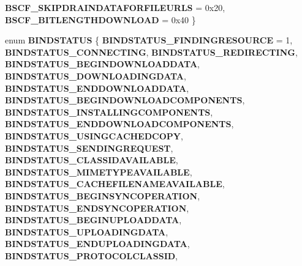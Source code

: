 \begin{DoxyCompactItemize}
{\bfseries B\+S\+C\+F\+\_\+\+S\+K\+I\+P\+D\+R\+A\+I\+N\+D\+A\+T\+A\+F\+O\+R\+F\+I\+L\+E\+U\+R\+LS} = 0x20, 
{\bfseries B\+S\+C\+F\+\_\+B\+I\+T\+L\+E\+N\+G\+T\+H\+D\+O\+W\+N\+L\+O\+AD} = 0x40
 \}
\item 
\mbox{\label{interface_i_bind_status_callback_af3b79c7ef1f1b339b02de3c5c35e7f06}} 
enum {\bfseries B\+I\+N\+D\+S\+T\+A\+T\+US} \{ \newline
{\bfseries B\+I\+N\+D\+S\+T\+A\+T\+U\+S\+\_\+\+F\+I\+N\+D\+I\+N\+G\+R\+E\+S\+O\+U\+R\+CE} = 1, 
{\bfseries B\+I\+N\+D\+S\+T\+A\+T\+U\+S\+\_\+\+C\+O\+N\+N\+E\+C\+T\+I\+NG}, 
{\bfseries B\+I\+N\+D\+S\+T\+A\+T\+U\+S\+\_\+\+R\+E\+D\+I\+R\+E\+C\+T\+I\+NG}, 
{\bfseries B\+I\+N\+D\+S\+T\+A\+T\+U\+S\+\_\+\+B\+E\+G\+I\+N\+D\+O\+W\+N\+L\+O\+A\+D\+D\+A\+TA}, 
\newline
{\bfseries B\+I\+N\+D\+S\+T\+A\+T\+U\+S\+\_\+\+D\+O\+W\+N\+L\+O\+A\+D\+I\+N\+G\+D\+A\+TA}, 
{\bfseries B\+I\+N\+D\+S\+T\+A\+T\+U\+S\+\_\+\+E\+N\+D\+D\+O\+W\+N\+L\+O\+A\+D\+D\+A\+TA}, 
{\bfseries B\+I\+N\+D\+S\+T\+A\+T\+U\+S\+\_\+\+B\+E\+G\+I\+N\+D\+O\+W\+N\+L\+O\+A\+D\+C\+O\+M\+P\+O\+N\+E\+N\+TS}, 
{\bfseries B\+I\+N\+D\+S\+T\+A\+T\+U\+S\+\_\+\+I\+N\+S\+T\+A\+L\+L\+I\+N\+G\+C\+O\+M\+P\+O\+N\+E\+N\+TS}, 
\newline
{\bfseries B\+I\+N\+D\+S\+T\+A\+T\+U\+S\+\_\+\+E\+N\+D\+D\+O\+W\+N\+L\+O\+A\+D\+C\+O\+M\+P\+O\+N\+E\+N\+TS}, 
{\bfseries B\+I\+N\+D\+S\+T\+A\+T\+U\+S\+\_\+\+U\+S\+I\+N\+G\+C\+A\+C\+H\+E\+D\+C\+O\+PY}, 
{\bfseries B\+I\+N\+D\+S\+T\+A\+T\+U\+S\+\_\+\+S\+E\+N\+D\+I\+N\+G\+R\+E\+Q\+U\+E\+ST}, 
{\bfseries B\+I\+N\+D\+S\+T\+A\+T\+U\+S\+\_\+\+C\+L\+A\+S\+S\+I\+D\+A\+V\+A\+I\+L\+A\+B\+LE}, 
\newline
{\bfseries B\+I\+N\+D\+S\+T\+A\+T\+U\+S\+\_\+\+M\+I\+M\+E\+T\+Y\+P\+E\+A\+V\+A\+I\+L\+A\+B\+LE}, 
{\bfseries B\+I\+N\+D\+S\+T\+A\+T\+U\+S\+\_\+\+C\+A\+C\+H\+E\+F\+I\+L\+E\+N\+A\+M\+E\+A\+V\+A\+I\+L\+A\+B\+LE}, 
{\bfseries B\+I\+N\+D\+S\+T\+A\+T\+U\+S\+\_\+\+B\+E\+G\+I\+N\+S\+Y\+N\+C\+O\+P\+E\+R\+A\+T\+I\+ON}, 
{\bfseries B\+I\+N\+D\+S\+T\+A\+T\+U\+S\+\_\+\+E\+N\+D\+S\+Y\+N\+C\+O\+P\+E\+R\+A\+T\+I\+ON}, 
\newline
{\bfseries B\+I\+N\+D\+S\+T\+A\+T\+U\+S\+\_\+\+B\+E\+G\+I\+N\+U\+P\+L\+O\+A\+D\+D\+A\+TA}, 
{\bfseries B\+I\+N\+D\+S\+T\+A\+T\+U\+S\+\_\+\+U\+P\+L\+O\+A\+D\+I\+N\+G\+D\+A\+TA}, 
{\bfseries B\+I\+N\+D\+S\+T\+A\+T\+U\+S\+\_\+\+E\+N\+D\+U\+P\+L\+O\+A\+D\+I\+N\+G\+D\+A\+TA}, 
{\bfseries B\+I\+N\+D\+S\+T\+A\+T\+U\+S\+\_\+\+P\+R\+O\+T\+O\+C\+O\+L\+C\+L\+A\+S\+S\+ID}, 

\end{DoxyCompactItemize}
